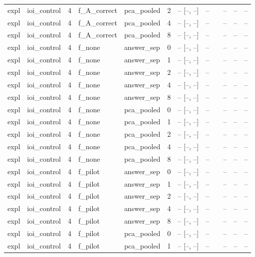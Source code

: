 \begin{tabular}{llrllrrrlrrr}
expl & ioi\_control & 4 & f\_A\_correct & pca\_pooled & 2 & -- [--, --] & -- &  & -- & -- & -- \\
expl & ioi\_control & 4 & f\_A\_correct & pca\_pooled & 4 & -- [--, --] & -- &  & -- & -- & -- \\
expl & ioi\_control & 4 & f\_A\_correct & pca\_pooled & 8 & -- [--, --] & -- &  & -- & -- & -- \\
expl & ioi\_control & 4 & f\_none & answer\_sep & 0 & -- [--, --] & -- &  & -- & -- & -- \\
expl & ioi\_control & 4 & f\_none & answer\_sep & 1 & -- [--, --] & -- &  & -- & -- & -- \\
expl & ioi\_control & 4 & f\_none & answer\_sep & 2 & -- [--, --] & -- &  & -- & -- & -- \\
expl & ioi\_control & 4 & f\_none & answer\_sep & 4 & -- [--, --] & -- &  & -- & -- & -- \\
expl & ioi\_control & 4 & f\_none & answer\_sep & 8 & -- [--, --] & -- &  & -- & -- & -- \\
expl & ioi\_control & 4 & f\_none & pca\_pooled & 0 & -- [--, --] & -- &  & -- & -- & -- \\
expl & ioi\_control & 4 & f\_none & pca\_pooled & 1 & -- [--, --] & -- &  & -- & -- & -- \\
expl & ioi\_control & 4 & f\_none & pca\_pooled & 2 & -- [--, --] & -- &  & -- & -- & -- \\
expl & ioi\_control & 4 & f\_none & pca\_pooled & 4 & -- [--, --] & -- &  & -- & -- & -- \\
expl & ioi\_control & 4 & f\_none & pca\_pooled & 8 & -- [--, --] & -- &  & -- & -- & -- \\
expl & ioi\_control & 4 & f\_pilot & answer\_sep & 0 & -- [--, --] & -- &  & -- & -- & -- \\
expl & ioi\_control & 4 & f\_pilot & answer\_sep & 1 & -- [--, --] & -- &  & -- & -- & -- \\
expl & ioi\_control & 4 & f\_pilot & answer\_sep & 2 & -- [--, --] & -- &  & -- & -- & -- \\
expl & ioi\_control & 4 & f\_pilot & answer\_sep & 4 & -- [--, --] & -- &  & -- & -- & -- \\
expl & ioi\_control & 4 & f\_pilot & answer\_sep & 8 & -- [--, --] & -- &  & -- & -- & -- \\
expl & ioi\_control & 4 & f\_pilot & pca\_pooled & 0 & -- [--, --] & -- &  & -- & -- & -- \\
expl & ioi\_control & 4 & f\_pilot & pca\_pooled & 1 & -- [--, --] & -- &  & -- & -- & -- \\

\end{tabular}
